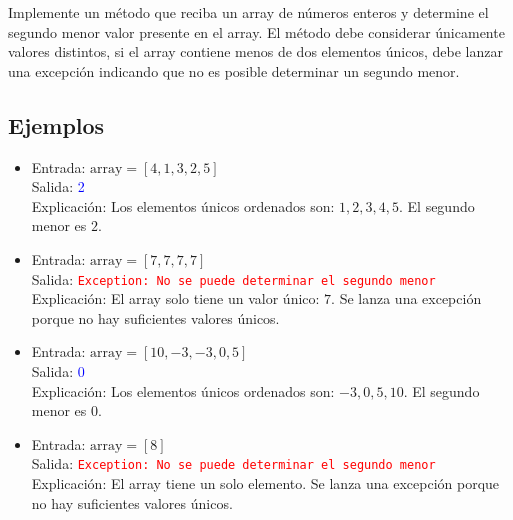 Implemente un método que reciba un array de números enteros y determine el segundo menor valor presente en el array. El método debe considerar únicamente valores distintos, si el array contiene menos de dos elementos únicos, debe lanzar una excepción indicando que no es posible determinar un segundo menor.
\subsection*{Ejemplos}
\begin{itemize}
    \item Entrada: \( \text{array} = [4, 1, 3, 2, 5] \)\\
    Salida: \textcolor{blue}{2}\\
    Explicación: Los elementos únicos ordenados son: \(1, 2, 3, 4, 5\).
    El segundo menor es \( 2 \).

    \item Entrada: \( \text{array} = [7, 7, 7, 7] \)\\
    Salida: \textcolor{red}{\texttt{Exception: No se puede determinar el segundo menor}}\\
    Explicación: El array solo tiene un valor único: \(7\).
    Se lanza una excepción porque no hay suficientes valores únicos.

    \item Entrada: \( \text{array} = [10, -3, -3, 0, 5] \)\\
    Salida: \textcolor{blue}{0}\\
    Explicación: Los elementos únicos ordenados son: \(-3, 0, 5, 10\).
    El segundo menor es \( 0 \).

    \item Entrada: \( \text{array} = [8] \)\\
    Salida: \textcolor{red}{\texttt{Exception: No se puede determinar el segundo menor}}\\
    Explicación: El array tiene un solo elemento. Se lanza una excepción porque no hay suficientes valores únicos.
\end{itemize}